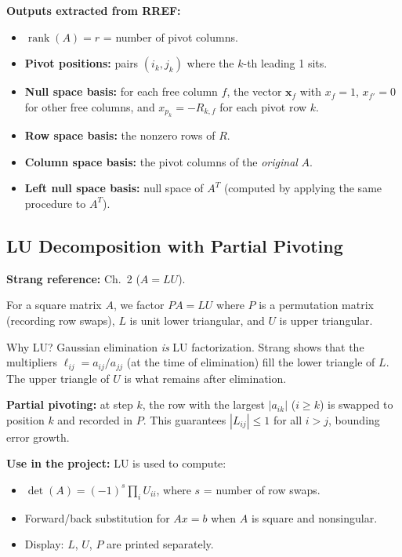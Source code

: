 \documentclass[12pt, a4paper]{article}
\newcommand{\rank}{\operatorname{rank}}
\begin{document}
\medskip
\noindent
\textbf{Outputs extracted from RREF:}
\begin{itemize}[noitemsep]
  \item $\rank(A) = r$ = number of pivot columns.
  \item \textbf{Pivot positions:} pairs $(i_k, j_k)$ where the $k$-th leading 1 sits.
  \item \textbf{Null space basis:} for each free column $f$, the vector
        $\mathbf{x}_f$ with $x_f = 1$, $x_{f'} = 0$ for other free columns,
        and $x_{p_k} = -R_{k,f}$ for each pivot row $k$.
  \item \textbf{Row space basis:} the nonzero rows of $R$.
  \item \textbf{Column space basis:} the pivot columns of the \emph{original} $A$.
  \item \textbf{Left null space basis:} null space of $A^T$ (computed by applying
        the same procedure to $A^T$).
\end{itemize}

\subsection{LU Decomposition with Partial Pivoting}

\textbf{Strang reference:} Ch.\ 2 ($A = LU$).

For a square matrix $A$, we factor $PA = LU$ where $P$ is a permutation matrix
(recording row swaps), $L$ is unit lower triangular, and $U$ is upper triangular.

\begin{strangbox}{Why LU?}
Gaussian elimination \emph{is} LU factorization. Strang shows that the
multipliers $\ell_{ij} = a_{ij}/a_{jj}$ (at the time of elimination) fill the
lower triangle of $L$. The upper triangle of $U$ is what remains after
elimination.
\end{strangbox}

\noindent
\textbf{Partial pivoting:} at step $k$, the row with the largest $|a_{ik}|$
($i \geq k$) is swapped to position $k$ and recorded in $P$.  This guarantees
$|L_{ij}| \leq 1$ for all $i > j$, bounding error growth.

\medskip
\noindent
\textbf{Use in the project:} LU is used to compute:
\begin{itemize}[noitemsep]
  \item $\det(A) = (-1)^s \prod_i U_{ii}$, where $s$ = number of row swaps.
  \item Forward/back substitution for $Ax=b$ when $A$ is square and nonsingular.
  \item Display: $L$, $U$, $P$ are printed separately.
\end{itemize}
\end{document}
